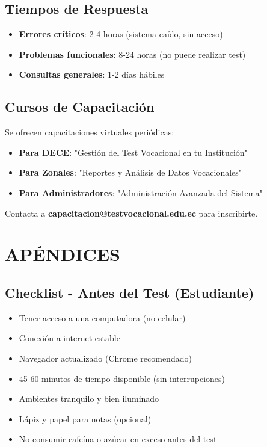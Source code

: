 \documentclass[12pt, a4paper]{report}
\begin{document}
\section{Tiempos de Respuesta}
\begin{itemize}
    \item \textbf{Errores críticos}: 2-4 horas (sistema caído, sin acceso)
    \item \textbf{Problemas funcionales}: 8-24 horas (no puede realizar test)
    \item \textbf{Consultas generales}: 1-2 días hábiles
\end{itemize}

\section{Cursos de Capacitación}
Se ofrecen capacitaciones virtuales periódicas:
\begin{itemize}
    \item \textbf{Para DECE}: "Gestión del Test Vocacional en tu Institución"
    \item \textbf{Para Zonales}: "Reportes y Análisis de Datos Vocacionales"
    \item \textbf{Para Administradores}: "Administración Avanzada del Sistema"
\end{itemize}
Contacta a \textbf{capacitacion@testvocacional.edu.ec} para inscribirte.

\appendix
\chapter{APÉNDICES}

\section{Checklist - Antes del Test (Estudiante)}
\begin{itemize}
    \item Tener acceso a una computadora (no celular)
    \item Conexión a internet estable
    \item Navegador actualizado (Chrome recomendado)
    \item 45-60 minutos de tiempo disponible (sin interrupciones)
    \item Ambientes tranquilo y bien iluminado
    \item Lápiz y papel para notas (opcional)
    \item No consumir cafeína o azúcar en exceso antes del test
\end{itemize}
\end{document}
